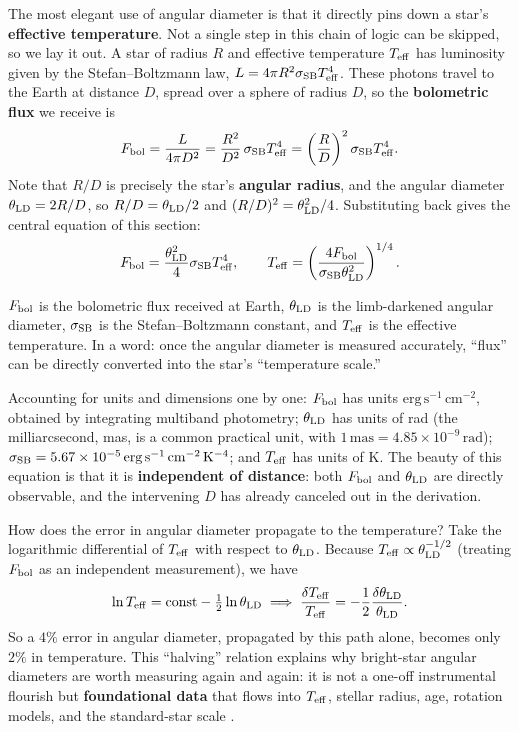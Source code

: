 The most elegant use of angular diameter is that it directly pins down a star's \textbf{effective temperature}. Not a single step in this chain of logic can be skipped, so we lay it out. A star of radius \(R\) and effective temperature \(T_{\rm eff}\) has luminosity given by the Stefan--Boltzmann law, \(L=4\pi R^2\sigma_{\rm SB}T_{\rm eff}^4\). These photons travel to the Earth at distance \(D\), spread over a sphere of radius \(D\), so the \textbf{bolometric flux} we receive is
\[
  F_{\rm bol}=\frac{L}{4\pi D^2}
  =\frac{R^2}{D^2}\,\sigma_{\rm SB}T_{\rm eff}^4
  =\left(\frac{R}{D}\right)^2\sigma_{\rm SB}T_{\rm eff}^4 .
\]
Note that \(R/D\) is precisely the star's \textbf{angular radius}, and the angular diameter \(\theta_{\rm LD}=2R/D\), so \(R/D=\theta_{\rm LD}/2\) and \((R/D)^2=\theta_{\rm LD}^2/4\). Substituting back gives the central equation of this section:
\begin{equation}
  F_{\rm bol}
  =
  \frac{\theta_{\rm LD}^2}{4}
  \sigma_{\rm SB}T_{\rm eff}^4,
  \qquad
  T_{\rm eff}
  =
  \left(
  \frac{4F_{\rm bol}}
  {\sigma_{\rm SB}\theta_{\rm LD}^2}
  \right)^{1/4}.
  \label{eq:e25-teff}
\end{equation}
\begin{formulaexplain}
\(F_{\rm bol}\) is the bolometric flux received at Earth, \(\theta_{\rm LD}\) is the limb-darkened angular diameter, \(\sigma_{\rm SB}\) is the Stefan--Boltzmann constant, and \(T_{\rm eff}\) is the effective temperature. In a word: once the angular diameter is measured accurately, ``flux'' can be directly converted into the star's ``temperature scale.''
\end{formulaexplain}
Accounting for units and dimensions one by one: \(F_{\rm bol}\) has units \(\mathrm{erg\,s^{-1}\,cm^{-2}}\), obtained by integrating multiband photometry; \(\theta_{\rm LD}\) has units of rad (the milliarcsecond, mas, is a common practical unit, with \(1\,\mathrm{mas}=4.85\times10^{-9}\,\mathrm{rad}\)); \(\sigma_{\rm SB}=5.67\times10^{-5}\,\mathrm{erg\,s^{-1}\,cm^{-2}\,K^{-4}}\); and \(T_{\rm eff}\) has units of K. The beauty of this equation is that it is \textbf{independent of distance}: both \(F_{\rm bol}\) and \(\theta_{\rm LD}\) are directly observable, and the intervening \(D\) has already canceled out in the derivation.

How does the error in angular diameter propagate to the temperature? Take the logarithmic differential of \(T_{\rm eff}\) with respect to \(\theta_{\rm LD}\). Because \(T_{\rm eff}\propto\theta_{\rm LD}^{-1/2}\) (treating \(F_{\rm bol}\) as an independent measurement), we have
\[
  \ln T_{\rm eff}=\text{const}-\tfrac12\ln\theta_{\rm LD}
  \;\Longrightarrow\;
  \frac{\delta T_{\rm eff}}{T_{\rm eff}}=-\frac12\frac{\delta\theta_{\rm LD}}{\theta_{\rm LD}} .
\]
So a \(4\%\) error in angular diameter, propagated by this path alone, becomes only \(2\%\) in temperature. This ``halving'' relation explains why bright-star angular diameters are worth measuring again and again: it is not a one-off instrumental flourish but \textbf{foundational data} that flows into \(T_{\rm eff}\), stellar radius, age, rotation models, and the standard-star scale \citep{1967MNRAS.137..393H,1977MNRAS.180..177B,2003RPPh...66..789M}.

